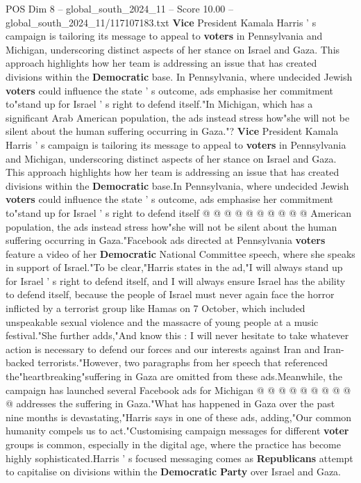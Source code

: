 \begin{textsample}{POS Dim 8 – global\_south\_2024\_11 – Score 10.00 – global\_south\_2024\_11/117107183.txt}  \label{ex:f8_pos_147}
\textbf{Vice} President Kamala Harris ' s campaign is tailoring its message to appeal to \textbf{voters} in Pennsylvania and Michigan, underscoring distinct aspects of her stance on Israel and Gaza.
This approach highlights how her team is addressing an issue that has created divisions within the \textbf{Democratic} base.
In Pennsylvania, where undecided Jewish \textbf{voters} could influence the state ' s outcome, ads emphasise her commitment to"stand up for Israel ' s right to defend itself."In Michigan, which has a significant Arab American population, the ads instead stress how"she will not be silent about the human suffering occurring in Gaza."? \textbf{Vice} President Kamala Harris ' s campaign is tailoring its message to appeal to \textbf{voters} in Pennsylvania and Michigan, underscoring distinct aspects of her stance on Israel and Gaza.
This approach highlights how her team is addressing an issue that has created divisions within the \textbf{Democratic} base.In Pennsylvania, where undecided Jewish \textbf{voters} could influence the state ' s outcome, ads emphasise her commitment to"stand up for Israel ' s right to defend itself @ @ @ @ @ @ @ @ @ @ American population, the ads instead stress how"she will not be silent about the human suffering occurring in Gaza."Facebook ads directed at Pennsylvania \textbf{voters} feature a video of her \textbf{Democratic} National Committee speech, where she speaks in support of Israel."To be clear,"Harris states in the ad,"I will always stand up for Israel ' s right to defend itself, and I will always ensure Israel has the ability to defend itself, because the people of Israel must never again face the horror inflicted by a terrorist group like Hamas on 7 October, which included unspeakable sexual violence and the massacre of young people at a music festival."She further adds,"And know this : I will never hesitate to take whatever action is necessary to defend our forces and our interests against Iran and Iran-backed terrorists."However, two paragraphs from her speech that referenced the"heartbreaking"suffering in Gaza are omitted from these ads.Meanwhile, the campaign has launched several Facebook ads for Michigan @ @ @ @ @ @ @ @ @ @ addresses the suffering in Gaza."What has happened in Gaza over the past nine months is devastating,"Harris says in one of these ads, adding,"Our common humanity compels us to act."Customising campaign messages for different \textbf{voter} groups is common, especially in the digital age, where the practice has become highly sophisticated.Harris ' s focused messaging comes as \textbf{Republicans} attempt to capitalise on divisions within the \textbf{Democratic} \textbf{Party} over Israel and Gaza.

\end{textsample}
